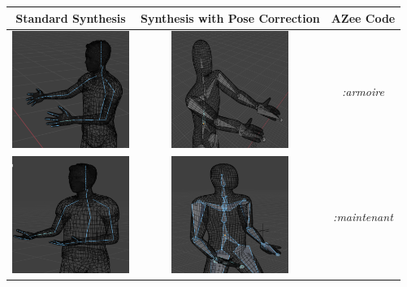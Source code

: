 \documentclass[../../main.tex]{subfiles}
\begin{document}
\begin{table}
  \centering
  \begin{tabular}{|c|c|c|}
    \hline
    \textbf{Standard Synthesis} & \textbf{Synthesis with Pose Correction} & \textbf{AZee Code} \\
    \hline
    \includegraphics[width = 1.5in]{chapters/intermediate_blocks_pose_correction/images/standard_synthesis_armoire.png} & \includegraphics[width = 1.5in]{chapters/intermediate_blocks_pose_correction/images/pose_correction_synthesis_armoire.png} & 
      \emph{:armoire} \\
    \hline
    \includegraphics[width = 1.5in]{chapters/intermediate_blocks_pose_correction/images/standard_synthesis_maintenant.png} & \includegraphics[width = 1.5in]{chapters/intermediate_blocks_pose_correction/images/pose_correction_synthesis_maintenant.png} &
      \emph{:maintenant} \\
    \hline

\end{tabular}
\end{table}
\end{document}
